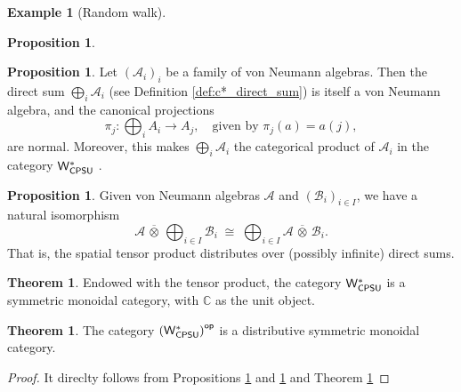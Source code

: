 \documentclass[10pt,a4paper]{amsart}
\theoremstyle{definition}
\theoremstyle{definition}
\newtheorem{example}[definition]{Example}
\theoremstyle{definition}
\theoremstyle{definition}
\newtheorem{proposition}[definition]{Proposition}
\theoremstyle{definition}
\theoremstyle{definition}
\newtheorem{theorem}[definition]{Theorem}
\begin{document}
\begin{example}[Random walk]
\begin{proposition}
  
\end{proposition}

\begin{proposition} \cite[Exercise 47 IV]{westerbaanCategoryNeumannAlgebras2019}  \label{prop:wcpsu_products}
  Let \( (\mathcal{A}_i)_i \) be a family of von Neumann algebras. Then the direct sum \( \bigoplus_i \mathcal{A}_i \) (see Definition \ref{def:c*_direct_sum}) is itself a von Neumann algebra, and the canonical projections
\[
\pi_j : \bigoplus_i A_i \to A_j, \quad \text{given by } \pi_j(a) = a(j),
\]
are normal.
Moreover, this makes \( \bigoplus_i \mathcal{A}_i \) the categorical product of \( \mathcal{A}_i \) in the category $\mathsf{W^*_{CPSU}}$ .
\end{proposition}

\begin{proposition}\cite[Proposition 117 III] {westerbaanCategoryNeumannAlgebras2019} \label{prop:w*_product_disct_tensor}
  Given von Neumann algebras \( \mathcal{A} \) and \( (\mathcal{B}_i)_{i \in I} \), we have a natural isomorphism
\[
\mathcal{A} \,\overline{\otimes}\, \bigoplus_{i \in I} \mathcal{B}_i \;\cong\; \bigoplus_{i \in I} \mathcal{A} \,\overline{\otimes}\, \mathcal{B}_i.
\]
That is, the spatial tensor product distributes over (possibly infinite) direct sums.
\end{proposition}

\begin{theorem} \cite[Theorem 119 V]{westerbaanCategoryNeumannAlgebras2019} \label{thm:wcpsu_monoidal}
Endowed with the tensor product, the category $\mathsf{W^*_{CPSU}}$  is a symmetric monoidal category, with \( \mathbb{C} \) as the unit object.
\end{theorem}

\begin{theorem}
The category $\left(\mathsf{W^*_{CPSU}}\right)^{\mathsf{op}}$ is a distributive symmetric monoidal category.
\end{theorem}

\begin{proof}
  It direclty follows from Propositions \ref{prop:wcpsu_products} and \ref{prop:w*_product_disct_tensor} and Theorem \ref{thm:wcpsu_monoidal}
\end{proof}







\end{example}
\end{document}
